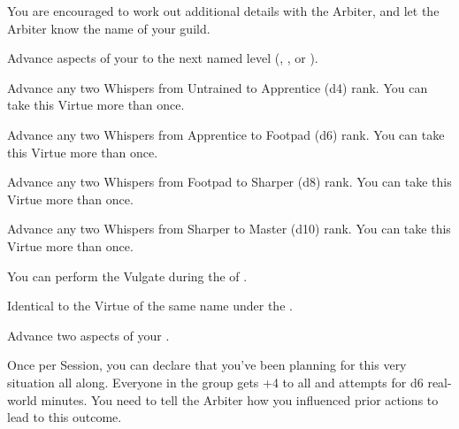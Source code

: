 \begin{multicols*}{2}
You are encouraged to work out additional details with the Arbiter, and let the Arbiter know the name of your guild.


Advance  aspects of your  to the next named level (\DEATH, \INJURY, or \INSANITY).


Advance any two Whispers from Untrained to Apprentice (d4) rank. You can take this Virtue more than once.


Advance any two Whispers from Apprentice to Footpad (d6) rank. You can take this Virtue more than once.


Advance any two Whispers from Footpad to Sharper (d8) rank. You can take this Virtue more than once.


Advance any two Whispers from Sharper to Master (d10) rank. You can take this Virtue more than once.


You can perform the  Vulgate during the  of . 


Identical to the Virtue of the same name under the .



Advance two  aspects of your  \DCUP.


Once per Session, you can declare that you’ve been planning for this very situation all along. Everyone in the group gets +4 to all \RO and \RB attempts for d6 real-world minutes.  You need to tell the Arbiter how you influenced prior actions to lead to this outcome. 


\end{multicols*}
